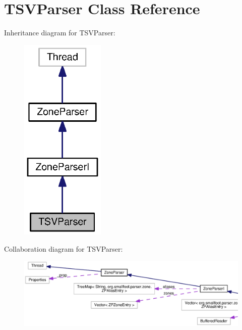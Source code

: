 \section{T\+S\+V\+Parser Class Reference}
\label{classorg_1_1smallfoot_1_1parser_1_1zone_1_1TSVParser}


Inheritance diagram for T\+S\+V\+Parser\+:\nopagebreak
\begin{figure}[H]
\begin{center}
\leavevmode
\includegraphics[width=114pt]{classorg_1_1smallfoot_1_1parser_1_1zone_1_1TSVParser__inherit__graph}
\end{center}
\end{figure}


Collaboration diagram for T\+S\+V\+Parser\+:\nopagebreak
\begin{figure}[H]
\begin{center}
\leavevmode
\includegraphics[width=350pt]{classorg_1_1smallfoot_1_1parser_1_1zone_1_1TSVParser__coll__graph}
\end{center}
\end{figure}
